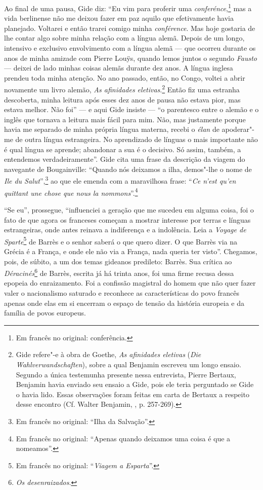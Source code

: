 Ao final de uma pausa, Gide diz: ``Eu vim para proferir uma
\emph{conferénce},\footnote{Em francês no original: conferência. \versal{[N. T.]}} mas a vida
berlinense não me deixou fazer em paz aquilo que efetivamente havia
planejado. Voltarei e então trarei comigo minha \emph{conférence}. Mas
hoje gostaria de lhe contar algo sobre minha relação com a língua alemã.
Depois de um longo, intensivo e exclusivo envolvimento com a língua
alemã --- que ocorreu durante os anos de minha amizade com Pierre Louÿs,
quando lemos juntos o segundo \emph{Fausto} --- deixei de lado minhas
coisas alemãs durante dez anos. A língua inglesa prendeu toda minha
atenção. No ano passado, então, no Congo, voltei a abrir novamente um
livro alemão, \emph{As afinidades eletivas}.\footnote{Gide
  refere"-e à obra de Goethe, \emph{As afinidades eletivas} (\emph{Die
  Wahlverwandschaften}), sobre a qual Benjamin escreveu um longo ensaio.
  Segundo a única testemunha presente nessa entrevista, Pierre Bertaux,
  Benjamin havia enviado seu ensaio a Gide, pois ele teria perguntado se
  Gide o havia lido. Essas observações foram feitas em carta de Bertaux
  a respeito desse encontro (Cf. Walter Benjamin, ,
  p. 257-269). \versal{[N. T.]}} Então fiz uma estranha descoberta, minha leitura após esses
dez anos de pausa não estava pior, mas estava melhor. Não foi'' --- e aqui
Gide insiste --- ``o parentesco entre o alemão e o inglês que tornava a
leitura mais fácil para mim. Não, mas justamente porque havia me
separado de minha própria língua materna, recebi o \emph{élan} de
apoderar"-me de outra língua estrangeira. No aprendizado de línguas o
mais importante não é qual língua se aprende; abandonar a sua é o
decisivo. Só assim, também, a entendemos verdadeiramente''. Gide cita
uma frase da descrição da viagem do navegante de Bougainville: ``Quando
nós deixamos a ilha, demos"-lhe o nome de \emph{Ile du Salut}'',\footnote{Em francês no original: ``Ilha da Salvação''. \versal{[N. T.]}} ao que ele emenda com a maravilhosa
frase: ``\emph{Ce n'est qu'en quittant une chose que nous la
nommons}''.\footnote{Em francês no original: ``Apenas quando deixamos uma coisa é que a
  nomeamos''. \versal{[N. T.]}}

``Se eu'', prossegue, ``influenciei a geração que me sucedeu em alguma
coisa, foi o fato de que agora os franceses começam a mostrar interesse
por terras e línguas estrangeiras, onde antes reinava a indiferença e a
indolência. Leia a \emph{Voyage de Sparte}\footnote{Em francês no original: ``\emph{Viagem
  a Esparta}''. \versal{[N. T.]}} de Barrès e o senhor saberá o que quero dizer. O que
Barrès via na Grécia é a França, e onde ele não via a França, nada
queria ter visto''. Chegamos, pois, de súbito, a um dos temas gideanos
predileto: Barrès. Sua crítica ao \emph{Déracinés}\footnote{\emph{Os desenraizados}. \versal{[N. T.]}} de Barrès, escrita já há trinta anos, foi uma firme recusa dessa
epopeia do enraizamento. Foi a confissão magistral do homem que não quer
fazer valer o nacionalismo saturado e reconhece as características do
povo francês apenas onde elas em si encerram o espaço de tensão da
história europeia e da família de povos europeus.

